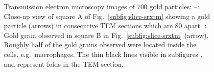 \begin{figure}[htb]
\hfill
{}\hfill
\caption{Transmission electron microscopy images of \unit{700}{\nano\meter} gold particles: --: Close-up view of square A of Fig.~\ref{subfig:slice-srxtm} showing a gold particle (arrows) in consecutive TEM sections which are \unit{80}{\nano\meter} apart. : Gold grain observed in square B in Fig.~\ref{subfig:slice-srxtm} (arrow). Roughly half of the gold grains observed were located inside the cells, e.g.\ macrophages. The thin black lines visible in subfigures ,  and  represent folds in the TEM section.}
\label{fig:srxtm-em}
\end{figure}

